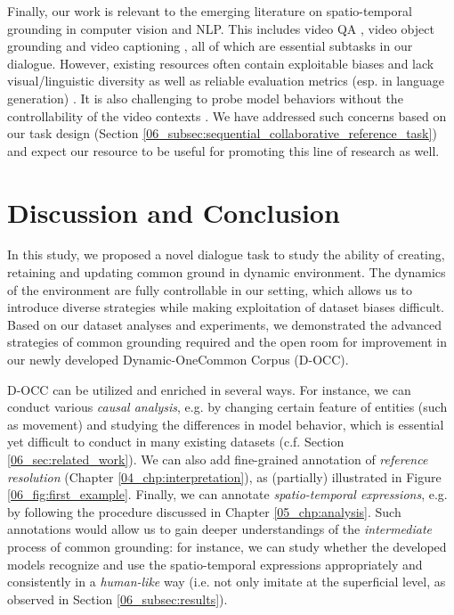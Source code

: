 Finally, our work is relevant to the emerging literature on spatio-temporal grounding in computer vision and NLP. This includes video QA \citep{lei-etal-2018-tvqa,yu2019activityqa,castro-etal-2020-lifeqa}, video object grounding \citep{ZhLoCoBMVC18,chen-etal-2019-weakly,Sadhu_2020_CVPR} and video captioning \citep{krishna2017dense}, all of which are essential subtasks in our dialogue. However, existing resources often contain exploitable biases and lack visual/linguistic diversity as well as reliable evaluation metrics (esp. in language generation) \citep{aafaq2019video}. It is also challenging to probe model behaviors without the controllability of the video contexts \citep{girdhar2020cater}. We have addressed such concerns based on our task design (Section \ref{06_subsec:sequential_collaborative_reference_task}) and expect our resource to be useful for promoting this line of research as well.

\section{Discussion and Conclusion}
\label{06_sec:conclusion}

In this study, we proposed a novel dialogue task to study the ability of creating, retaining and updating common ground in dynamic environment. The dynamics of the environment are fully controllable in our setting, which allows us to introduce diverse strategies while making exploitation of dataset biases difficult. Based on our dataset analyses and experiments, we demonstrated the advanced strategies of common grounding required and the open room for improvement in our newly developed Dynamic-OneCommon Corpus (D-OCC).

D-OCC can be utilized and enriched in several ways. For instance, we can conduct various \textit{causal analysis}, e.g. by changing certain feature of entities (such as movement) and studying the differences in model behavior, which is essential yet difficult to conduct in many existing datasets (c.f. Section \ref{06_sec:related_work}). We can also add fine-grained annotation of \textit{reference resolution} (Chapter \ref{04_chp:interpretation}), as (partially) illustrated in Figure \ref{06_fig:first_example}. Finally, we can annotate \textit{spatio-temporal expressions}, e.g. by following the procedure discussed in Chapter \ref{05_chp:analysis}. Such annotations would allow us to gain deeper understandings of the \textit{intermediate} process of common grounding: for instance, we can study whether the developed models recognize and use the spatio-temporal expressions appropriately and consistently in a \textit{human-like} way (i.e. not only imitate at the superficial level, as observed in Section \ref{06_subsec:results}).

